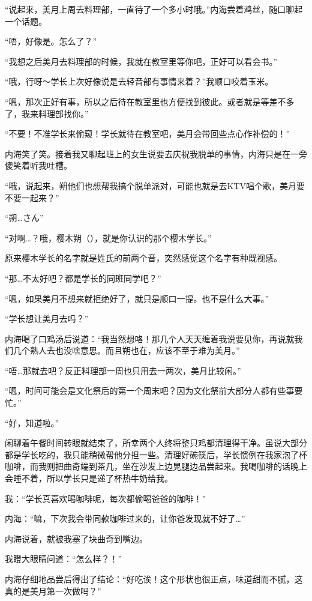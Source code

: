 “说起来，美月上周去料理部，一直待了一个多小时哦。”内海尝着鸡丝，随口聊起一个话题。

“唔，好像是。怎么了？”

“我想之后美月去料理部的时候，我就在教室里等你吧，正好可以看会书。”

“哦，行呀～学长上次好像说是去轻音部有事情来着？”我顺口咬着玉米。

“嗯，那次正好有事，所以之后待在教室里也方便找到彼此。或者就是等差不多了，我来料理部找你。”

“不要！不准学长来偷窥！学长就待在教室吧，美月会带回些点心作补偿的！”

内海笑了笑。接着我又聊起班上的女生说要去庆祝我脱单的事情，内海只是在一旁傻笑着听我吐槽。

“哦，说起来，朔他们也想帮我搞个脱单派对，可能也就是去KTV唱个歌，美月要不要一起来？”

“朔…さん”

“对啊…？哦，樱木朔（），就是你认识的那个樱木学长。”

原来樱木学长的名字就是姓氏的前两个音，突然感觉这个名字有种既视感。

“那…不太好吧？都是学长的同班同学吧？”

“嗯，如果美月不想来就拒绝好了，就只是顺口一提。也不是什么大事。”

“学长想让美月去吗？”

内海喝了口鸡汤后说道：“我当然想咯！那几个人天天缠着我说要见你，再说就我们几个熟人去也没啥意思。而且朔也在，应该不至于难为美月。”

“唔…那就去吧？反正料理部一周也只用去一两次，美月比较闲。”

“嗯，时间可能会是文化祭后的第一个周末吧？因为文化祭前大部分人都有些事要忙。”

“好，知道啦。”

\newday{\cookie\milk\sunny}

闲聊着午餐时间转眼就结束了，所幸两个人终将整只鸡都清理得干净。虽说大部分都是学长吃的，我只能稍微帮他分担一些。清理好碗筷后，学长惯例在我家泡了杯咖啡，而我则把曲奇端到茶几，坐在沙发上边晃腿边品尝起来。我喝咖啡的话晚上会睡不着，所以学长只是递了杯热牛奶给我。

我：“学长真喜欢喝咖啡呢，每次都偷喝爸爸的咖啡！”

内海：“嘛，下次我会带同款咖啡过来的，让你爸发现就不好了…”

内海说着，就被我塞了块曲奇到嘴边。

我瞪大眼睛问道：“怎么样？！”

内海仔细地品尝后得出了结论：“好吃诶！这个形状也很正点，味道甜而不腻，这真的是美月第一次做吗？”

